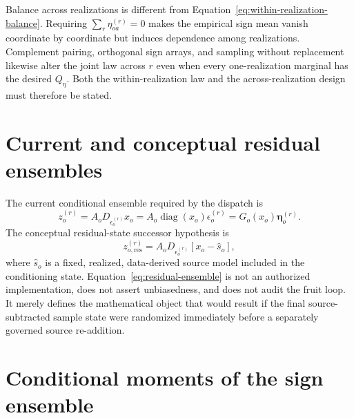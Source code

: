 \documentclass[11pt]{article}
\newcommand{\diag}{\operatorname{diag}}
\newcommand{\etaV}{\boldsymbol{\eta}}
\begin{document}
Balance across realizations is different from
Equation~\eqref{eq:within-realization-balance}.  Requiring
$\sum_r\eta_{oa}^{(r)}=0$ makes the empirical sign mean vanish coordinate by
coordinate but induces dependence among realizations.  Complement pairing,
orthogonal sign arrays, and sampling without replacement likewise alter the
joint law across $r$ even when every one-realization marginal has the desired
$Q_\eta$.  Both the within-realization law and the across-realization design
must therefore be stated.

\section{Current and conceptual residual ensembles}

The current conditional ensemble required by the dispatch is
\begin{equation}
  z_o^{(r)}
  =A_oD_{\epsilon_o^{(r)}}x_o
  =A_o\diag(x_o)\epsilon_o^{(r)}
  =G_o(x_o)\etaV_o^{(r)}.
  \label{eq:current-ensemble}
\end{equation}
The conceptual residual-state successor hypothesis is
\begin{equation}
  z_{o,\mathrm{res}}^{(r)}
  =A_oD_{\epsilon_o^{(r)}}[x_o-\widehat s_o],
  \label{eq:residual-ensemble}
\end{equation}
where $\widehat s_o$ is a fixed, realized, data-derived source model included
in the conditioning state.  Equation~\eqref{eq:residual-ensemble} is not an
authorized implementation, does not assert unbiasedness, and does not audit
the fruit loop.  It merely defines the mathematical object that would result
if the final source-subtracted sample state were randomized immediately before
a separately governed source re-addition.

\section{Conditional moments of the sign ensemble}
\end{document}
